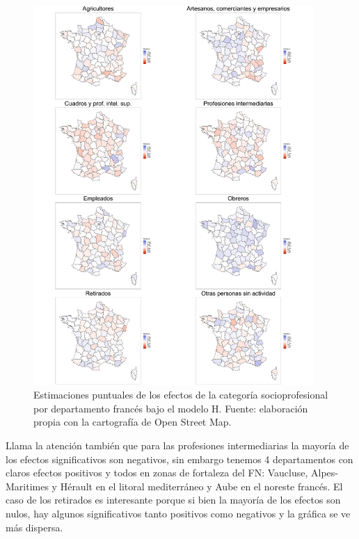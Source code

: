 \begin{figure}[H]
	\centering
	\includegraphics[width = 0.95\textwidth]{Figs/Efectos/Mapa_Efectos_Cat_Socioprof_Modelo_H}
	\caption{Estimaciones puntuales de los efectos de la categoría socioprofesional por departamento francés bajo el modelo H. Fuente: elaboración propia con la cartografía de Open Street Map.}
	\label{fig:Mapa_Efectos_Cat_Socioprof}
\end{figure}

Llama la atención también que para las profesiones intermediarias la mayoría de los efectos significativos son negativos, sin embargo tenemos 4 departamentos con claros efectos positivos y todos en zonas de fortaleza del FN: Vaucluse, Alpes-Maritimes y Hérault en el litoral mediterráneo y Aube en el noreste francés. El caso de los retirados es interesante porque si bien la mayoría de los efectos son nulos, hay algunos significativos tanto positivos como negativos y la gráfica se ve más dispersa.\\ 

